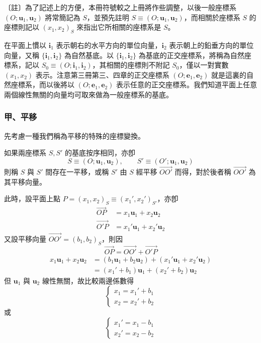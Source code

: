 〔註〕為了記述上的方便，本冊符號較之上冊將作些調整，以後一般座標系 $(O; \mathbf{u}_1, \mathbf{u}_2)$ 將常簡記為 $S$，並預先註明 $S \equiv (O; \mathbf{u}_1, \mathbf{u}_2)$，而相關於座標系 $S$ 的座標則記以 $(x_1, x_2)_S$ 來指出它所相關的座標系是 $S$。

在平面上慣以 $\mathbf{i}_1$ 表示朝右的水平方向的單位向量，$\mathbf{i}_2$ 表示朝上的鉛垂方向的單位向量，又稱 $\{\mathbf{i}_1, \mathbf{i}_2\}$ 為自然基底。以 $\{\mathbf{i}_1, \mathbf{i}_2\}$ 為基底的正交座標系，將稱為自然座標系，記以 $S_0 \equiv (O; \mathbf{i}_1, \mathbf{i}_2)$，其相關的座標則不附記 $S_0$，僅以一對實數 $(x_1, x_2)$ 表示。注意第三冊第三、四章的正交座標系 $(O; \mathbf{e}_1, \mathbf{e}_2)$ 就是這裏的自然座標系，而以後將以 $(O; \mathbf{e}_1, \mathbf{e}_2)$ 表示任意的正交座標系。我們知道平面上任意兩個線性無關的向量均可取來做為一般座標系的基底。

\subsubsection*{甲、平移}

先考慮一種我們稱為平移的特殊的座標變換。

\begin{definition}[定義]
如果兩座標系 $S, S'$ 的基底按序相同，亦卽
\[ S \equiv (O; \mathbf{u}_1, \mathbf{u}_2), \qquad S' \equiv (O'; \mathbf{u}_1, \mathbf{u}_2) \]
則稱 $S$ 與 $S'$ 間存在一平移，或稱 $S'$ 由 $S$ 經平移 $\vec{OO'}$ 而得，對於後者稱 $\vec{OO'}$ 為其平移向量。
\end{definition}

此時，設平面上點 $P = (x_1, x_2)_S \equiv (x_1', x_2')_{S'}$，亦卽
\begin{align*}
\vec{OP} &= x_1 \mathbf{u}_1 + x_2 \mathbf{u}_2 \\
\vec{O'P} &= x_1' \mathbf{u}_1 + x_2' \mathbf{u}_2
\end{align*}
又設平移向量 $\vec{OO'} = (b_1, b_2)_S$，則因
\[ \vec{OP} = \vec{OO'} + \vec{O'P} \]
\begin{align*}
x_1 \mathbf{u}_1 + x_2 \mathbf{u}_2 &= (b_1 \mathbf{u}_1 + b_2 \mathbf{u}_2) + (x_1' \mathbf{u}_1 + x_2' \mathbf{u}_2) \\
&= (x_1' + b_1) \mathbf{u}_1 + (x_2' + b_2) \mathbf{u}_2
\end{align*}
但 $\mathbf{u}_1$ 與 $\mathbf{u}_2$ 線性無關，故比較兩邊係數得
\begin{equation}
\begin{cases}
x_1 = x_1' + b_1 \\
x_2 = x_2' + b_2
\end{cases} \label{eq:b4-1-2-2}
\end{equation}
或
\begin{equation}
\begin{cases}
x_1' = x_1 - b_1 \\
x_2' = x_2 - b_2
\end{cases} \label{eq:b4-1-2-3}
\end{equation}

